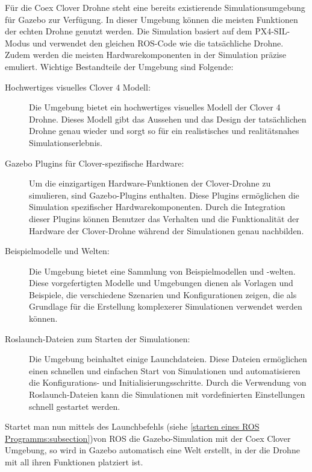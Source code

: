 Für die Coex Clover Drohne steht eine bereits existierende Simulationsumgebung für Gazebo zur Verfügung. In dieser Umgebung können die meisten Funktionen der echten Drohne genutzt werden. Die Simulation basiert auf dem PX4-SIL-Modus und verwendet den gleichen ROS-Code wie die tatsächliche Drohne. Zudem werden die meisten Hardwarekomponenten in der Simulation präzise emuliert. Wichtige Bestandteile der Umgebung sind Folgende:

\begin{description}
    \item[Hochwertiges visuelles Clover 4 Modell:] Die Umgebung bietet ein hochwertiges visuelles Modell der Clover 4 Drohne. Dieses Modell gibt das Aussehen und das Design der tatsächlichen Drohne genau wieder und sorgt so für ein realistisches und realitätsnahes Simulationserlebnis. 
    
    \item[Gazebo Plugins für Clover-spezifische Hardware:] Um die einzigartigen Hardware-Funktionen der Clover-Drohne zu simulieren, sind Gazebo-Plugins enthalten. Diese Plugins ermöglichen die Simulation spezifischer Hardwarekomponenten. Durch die Integration dieser Plugins können Benutzer das Verhalten und die Funktionalität der Hardware der Clover-Drohne während der Simulationen genau nachbilden.
    
    \item[Beispielmodelle und Welten:] Die Umgebung bietet eine Sammlung von Beispielmodellen und -welten. Diese vorgefertigten Modelle und Umgebungen dienen als Vorlagen und Beispiele, die verschiedene Szenarien und Konfigurationen zeigen, die als Grundlage für die Erstellung komplexerer Simulationen verwendet werden können.
    
    \item[Roslaunch-Dateien zum Starten der Simulationen:] Die Umgebung beinhaltet einige Launchdateien. Diese Dateien ermöglichen einen schnellen und einfachen Start von Simulationen und automatisieren die Konfigurations- und Initialisierungsschritte. Durch die Verwendung von Roslaunch-Dateien kann die Simulationen mit vordefinierten Einstellungen schnell gestartet werden.   
\end{description}

Startet man nun mittels des Launchbefehls (siehe \ref{starten eines ROS Programms:subsection})von \ac{ROS} die Gazebo-Simulation mit der Coex Clover Umgebung, so wird in Gazebo automatisch eine Welt erstellt, in der die Drohne mit all ihren Funktionen platziert ist.

